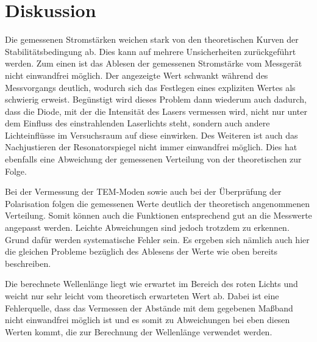 \section{Diskussion}
\label{sec:Diskussion}
Die gemessenen Stromstärken weichen stark von den theoretischen Kurven der Stabilitätsbedingung ab. Dies kann auf
mehrere Unsicherheiten zurückgeführt werden. Zum einen ist das Ablesen der gemessenen Stromstärke vom Messgerät nicht
einwandfrei möglich. Der angezeigte Wert schwankt während des Messvorgangs deutlich,
wodurch sich das Festlegen eines expliziten Wertes als schwierig erweist. Begünstigt wird
dieses Problem dann wiederum auch dadurch, dass die Diode, mit der die Intensität des Lasers
vermessen wird, nicht nur unter dem Einfluss des einstrahlenden Laserlichts steht, sondern
auch andere Lichteinflüsse im Versuchsraum auf diese einwirken. Des Weiteren ist auch
das Nachjustieren der Resonatorspiegel nicht immer einwandfrei möglich. Dies hat ebenfalls
eine Abweichung der gemessenen Verteilung von der theoretischen zur Folge.

Bei der Vermessung der TEM-Moden sowie auch bei der Überprüfung der Polarisation
folgen die gemessenen Werte deutlich der theoretisch angenommenen Verteilung. Somit
können auch die Funktionen entsprechend gut an die Messwerte angepasst werden.
Leichte Abweichungen sind jedoch trotzdem zu erkennen. Grund dafür werden systematische
Fehler sein. Es ergeben sich nämlich auch hier die gleichen Probleme bezüglich des
Ablesens der Werte wie oben bereits beschreiben.

Die berechnete Wellenlänge liegt wie erwartet im Bereich des roten Lichts und weicht
nur sehr leicht vom theoretisch erwarteten Wert ab. Dabei ist eine Fehlerquelle,
dass das Vermessen der Abstände mit dem gegebenen Maßband nicht einwandfrei
möglich ist und es somit zu Abweichungen bei eben diesen Werten kommt, die zur Berechnung
der Wellenlänge verwendet werden.
